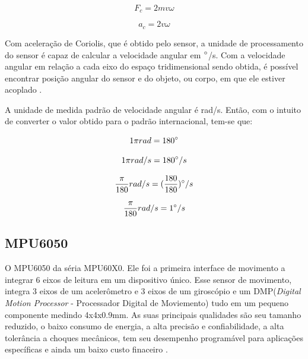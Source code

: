 			\begin{equation}
			F_{c} = 2mv\omega
			\end{equation}
			
			\begin{equation}
			a_{c} = 2v\omega
			\end{equation}
			
			Com aceleração de Coriolis, que é obtido pelo sensor, a unidade de processamento do sensor é capaz de calcular a velocidade angular em $\degree$/s. Com a velocidade angular em relação a cada eixo do espaço tridimensional sendo obtida, é possível encontrar posição angular do sensor e do objeto, ou corpo, em que ele estiver acoplado \cite{forhan2010}\cite{moyses2013}. 
			
			A unidade de medida padrão de velocidade angular  é rad/s. Então, com o intuito de converter o valor obtido para o padrão internacional, tem-se que:
			
			\begin{equation}
			1 \pi rad = 180\degree
			\end{equation}
			
			\begin{equation}
			1 \pi rad /s = 180\degree/s 
			\end{equation}
			
			\begin{equation}
			 \frac{\pi}{180} rad /s = (\frac{180}{180})\degree/s 
			\end{equation}
			
			\begin{equation}
			\frac{\pi}{180} rad /s = 1\degree/s 
			\end{equation}


\subsection{MPU6050}
	
	O MPU6050 da séria MPU60X0. Ele foi a primeira interface de movimento a integrar 6 eixos de leitura em um dispositivo único. Esse sensor de movimento, integra 3 eixos de um acelerômetro e 3 eixos de um giroscópio e um DMP(\textit{Digital Motion Processor} - Processador Digital de Moviemento) tudo em um pequeno componente medindo 4x4x0.9mm. As suas principais qualidades são seu tamanho reduzido, o baixo consumo de energia, a alta precisão e confiabilidade, a alta tolerância a choques mecânicos, tem seu desempenho programável para aplicações específicas e ainda um baixo custo finaceiro \cite{mpu6050}.
	
